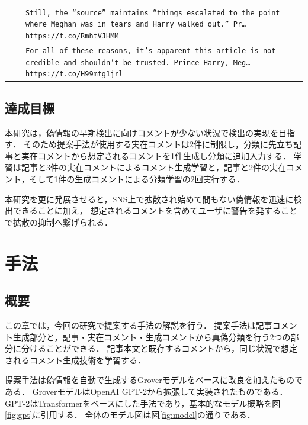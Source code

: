 \begin{landscape}
\begin{table}[p]
\begin{tabularx}{\linewidth}{llX}
                              &                             & \texttt{Still, the ``source'' maintains ``things escalated to the point where Meghan was in tears and Harry walked out.'' Pr… https://t.co/RmhtVJHMM}\\ \cline{3-3}
                              &                             & \texttt{For all of these reasons, it’s apparent this article is not credible and shouldn’t be trusted. Prince Harry, Meg… https://t.co/H99mtg1jrl}\\ \hline
    \end{tabularx}
\end{table} 
\end{landscape} 

\newpage
\subsection{達成目標}
本研究は，偽情報の早期検出に向けコメントが少ない状況で検出の実現を目指す．
そのため提案手法が使用する実在コメントは2件に制限し，分類に先立ち記事と実在コメントから想定されるコメントを1件生成し分類に追加入力する．
学習は記事と3件の実在コメントによるコメント生成学習と，記事と2件の実在コメント，そして1件の生成コメントによる分類学習の2回実行する．

本研究を更に発展させると，SNS上で拡散され始めて間もない偽情報を迅速に検出できることに加え，
想定されるコメントを含めてユーザに警告を発することで拡散の抑制へ繋げられる．

\section{手法}\label{cpt:gen_mtd}
\subsection{概要}
\label{sec:method_overall}
この章では，今回の研究で提案する手法の解説を行う．
提案手法は記事コメント生成部分と，記事・実在コメント・生成コメントから真偽分類を行う2つの部分に分けることができる．
記事本文と既存するコメントから，同じ状況で想定されるコメント生成技術を学習する．

提案手法は偽情報を自動で生成するGroverモデルをベースに改良を加えたものである．
GroverモデルはOpenAI GPT-2\cite{Radford_GPT2}から拡張して実装されたものである\cite{Shu:2017:FND:3137597.3137600}．
GPT-2はTransformerをベースにした手法であり，基本的なモデル概略を図\ref{fig:gpt}に引用する\cite{radford2018improving}．
全体のモデル図は図\ref{fig:model}の通りである．

